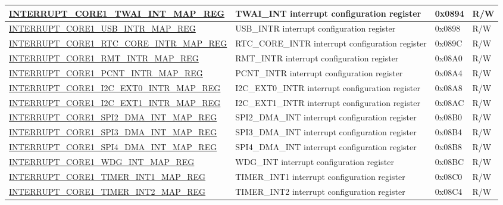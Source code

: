 \begin{landscape}
\begin{longtable}{ | p{10cm} | p{10.2cm} | p{1.3cm} | p{1cm} | }
\hyperref[regdesc:INTERRUPTCORE1TWAIINTMAPREG]{INTERRUPT\_CORE1\_TWAI\_INT\_MAP\_REG} & TWAI\_INT interrupt configuration register & 0x0894 & R/W \\ \hline
\hyperref[regdesc:INTERRUPTCORE1USBINTRMAPREG]{INTERRUPT\_CORE1\_USB\_INTR\_MAP\_REG} & USB\_INTR interrupt configuration register & 0x0898 & R/W \\ \hline
\hyperref[regdesc:INTERRUPTCORE1RTCCOREINTRMAPREG]{INTERRUPT\_CORE1\_RTC\_CORE\_INTR\_MAP\_REG} & RTC\_CORE\_INTR interrupt configuration register & 0x089C & R/W \\ \hline
\hyperref[regdesc:INTERRUPTCORE1RMTINTRMAPREG]{INTERRUPT\_CORE1\_RMT\_INTR\_MAP\_REG} & RMT\_INTR interrupt configuration register & 0x08A0 & R/W \\ \hline
\hyperref[regdesc:INTERRUPTCORE1PCNTINTRMAPREG]{INTERRUPT\_CORE1\_PCNT\_INTR\_MAP\_REG} & PCNT\_INTR interrupt configuration register & 0x08A4 & R/W \\ \hline
\hyperref[regdesc:INTERRUPTCORE1I2CEXT0INTRMAPREG]{INTERRUPT\_CORE1\_I2C\_EXT0\_INTR\_MAP\_REG} & I2C\_EXT0\_INTR interrupt configuration register & 0x08A8 & R/W \\ \hline
\hyperref[regdesc:INTERRUPTCORE1I2CEXT1INTRMAPREG]{INTERRUPT\_CORE1\_I2C\_EXT1\_INTR\_MAP\_REG} & I2C\_EXT1\_INTR interrupt configuration register & 0x08AC & R/W \\ \hline
\hyperref[regdesc:INTERRUPTCORE1SPI2DMAINTMAPREG]{INTERRUPT\_CORE1\_SPI2\_DMA\_INT\_MAP\_REG} & SPI2\_DMA\_INT interrupt configuration register & 0x08B0 & R/W \\ \hline
\hyperref[regdesc:INTERRUPTCORE1SPI3DMAINTMAPREG]{INTERRUPT\_CORE1\_SPI3\_DMA\_INT\_MAP\_REG} & SPI3\_DMA\_INT interrupt configuration register & 0x08B4 & R/W \\ \hline
\hyperref[regdesc:INTERRUPTCORE1SPI4DMAINTMAPREG]{INTERRUPT\_CORE1\_SPI4\_DMA\_INT\_MAP\_REG} & SPI4\_DMA\_INT interrupt configuration register & 0x08B8 & R/W \\ \hline
\hyperref[regdesc:INTERRUPTCORE1WDGINTMAPREG]{INTERRUPT\_CORE1\_WDG\_INT\_MAP\_REG} & WDG\_INT interrupt configuration register & 0x08BC & R/W \\ \hline
\hyperref[regdesc:INTERRUPTCORE1TIMERINT1MAPREG]{INTERRUPT\_CORE1\_TIMER\_INT1\_MAP\_REG} & TIMER\_INT1 interrupt configuration register & 0x08C0 & R/W \\ \hline
\hyperref[regdesc:INTERRUPTCORE1TIMERINT2MAPREG]{INTERRUPT\_CORE1\_TIMER\_INT2\_MAP\_REG} & TIMER\_INT2 interrupt configuration register & 0x08C4 & R/W \\ \hline

\end{longtable}
\end{landscape}
